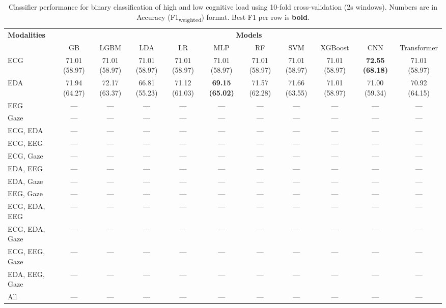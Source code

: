 \begin{table}[!htbp]
  \centering
  \scriptsize
  \setlength{\tabcolsep}{3pt}
  \caption{Classifier performance for binary classification of high and low cognitive load using 10-fold cross-validation (2s windows). Numbers are in Accuracy (F1\textsubscript{weighted}) format. Best F1 per row is \textbf{bold}.}
  \label{tab:results_10fold_2s}
  \begin{tabular}{lcccccccccc}
    \toprule
    \textbf{Modalities} & \multicolumn{10}{c}{\textbf{Models}} \\
    \cmidrule(l){2-11}
    & GB & LGBM & LDA & LR & MLP & RF & SVM & XGBoost & CNN & Transformer \\
    \midrule
    ECG & 71.01 (58.97) & 71.01 (58.97) & 71.01 (58.97) & 71.01 (58.97) & 71.01 (58.97) & 71.01 (58.97) & 71.01 (58.97) & 71.01 (58.97) & \textbf{72.55 (68.18)} & 71.01 (58.97) \\
    EDA & 71.94 (64.27) & 72.17 (63.37) & 66.81 (55.23) & 71.12 (61.03) & \textbf{69.15 (65.02)} & 71.57 (62.28) & 71.66 (63.55) & 71.01 (58.97) & 71.00 (59.34) & 70.92 (64.15) \\
    EEG & — & — & — & — & — & — & — & — & — & — \\
    Gaze & — & — & — & — & — & — & — & — & — & — \\
    \midrule
    ECG, EDA & — & — & — & — & — & — & — & — & — & — \\
    ECG, EEG & — & — & — & — & — & — & — & — & — & — \\
    ECG, Gaze & — & — & — & — & — & — & — & — & — & — \\
    EDA, EEG & — & — & — & — & — & — & — & — & — & — \\
    EDA, Gaze & — & — & — & — & — & — & — & — & — & — \\
    EEG, Gaze & — & — & — & — & — & — & — & — & — & — \\
    \midrule
    ECG, EDA, EEG & — & — & — & — & — & — & — & — & — & — \\
    ECG, EDA, Gaze & — & — & — & — & — & — & — & — & — & — \\
    ECG, EEG, Gaze & — & — & — & — & — & — & — & — & — & — \\
    EDA, EEG, Gaze & — & — & — & — & — & — & — & — & — & — \\
    \midrule
    All & — & — & — & — & — & — & — & — & — & — \\
    \bottomrule
  \end{tabular}
\end{table}
